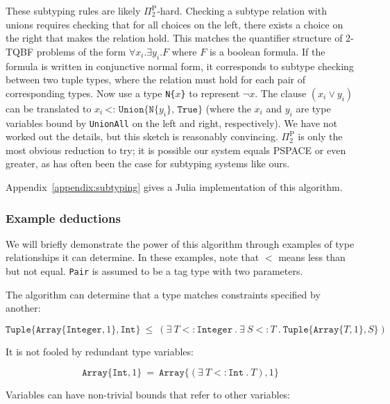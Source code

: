 
These subtyping rules are likely $\Pi_2^{\textrm{P}}$-hard.
Checking a subtype relation with unions requires checking that for all choices
on the left, there exists a choice on the right that makes the relation hold.
This matches the quantifier structure of 2-TQBF problems of the form
$\forall x_i . \exists y_i . F$ where $F$ is a boolean formula. If the formula
is written in conjunctive normal form, it corresponds to subtype checking
between two tuple types, where the relation must hold for each pair of
corresponding types. Now use a type \texttt{N\{}$x$\texttt{\}} to
represent $\neg x$. The clause $(x_i \vee y_i)$ can be translated to
$x_i\ \texttt{<:\ Union\{N\{}y_i\texttt{\}, True\}}$ (where the $x_i$ and
$y_i$ are type variables bound by \texttt{UnionAll} on the left and right,
respectively).
We have not worked out the details, but this sketch is reasonably
convincing. $\Pi_2^{\textrm{P}}$ is only the most obvious
reduction to try; it is possible our system equals PSPACE or even greater,
as has often been the case for subtyping systems like ours.

Appendix~\ref{appendix:subtyping} gives a Julia implementation of this
algorithm.

\subsubsection{Example deductions}

We will briefly demonstrate the power of this algorithm through examples of
type relationships it can determine.
In these examples, note that $<$ means less than but not equal.
\texttt{Pair} is assumed to be a tag type with two parameters.

\noindent
The algorithm can determine that a type matches constraints specified by another:

\vspace{-5ex}
\[
\texttt{Tuple}\{\texttt{Array}\{\texttt{Integer},1\}, \texttt{Int}\}\ \leq\ 
  (\exists\ T<:\texttt{Integer}\ .\ \exists\ S<:T\ .\ \texttt{Tuple}\{\texttt{Array}\{T,1\},S\})
\]

\vspace{-1ex}
\noindent
It is not fooled by redundant type variables:

\vspace{-2ex}
\[
\texttt{Array}\{\texttt{Int},1\}\ =\ 
  \texttt{Array}\{(\exists\ T<:\texttt{Int}\ .\ T), 1\} \]

\noindent
Variables can have non-trivial bounds that refer to other variables:

